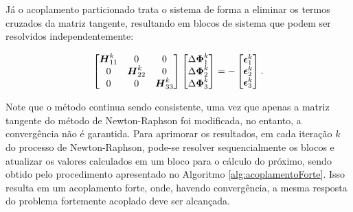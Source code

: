 Já o acoplamento particionado trata o sistema de forma a eliminar os termos cruzados da matriz tangente, resultando em blocos de sistema que podem ser resolvidos independentemente:

\begin{equation}
    \begin{bmatrix}
        \boldsymbol{H}_{11}^k & 0             & 0             \\
        0             & \boldsymbol{H}_{22}^k & 0             \\
        0             & 0             & \boldsymbol{H}_{33}^k
    \end{bmatrix}\begin{bmatrix}
        \Delta\boldsymbol{\Phi}_1^k \\\Delta\boldsymbol{\Phi}_2^k\\\Delta\boldsymbol{\Phi}_3^k
    \end{bmatrix}=-\begin{bmatrix}
        \boldsymbol{\epsilon}_1^k \\\boldsymbol{\epsilon}_2^k\\\boldsymbol{\epsilon}_3^k
    \end{bmatrix}\text{.}
\end{equation}

Note que o método continua sendo consistente, uma vez que apenas a matriz tangente do método de Newton-Raphson foi modificada, no entanto, a convergência não é garantida.
Para aprimorar os resultados, em cada iteração $k$ do processo de Newton-Raphson, pode-se resolver sequencialmente os blocos e atualizar os valores calculados em um bloco para o cálculo do próximo, sendo obtido pelo procedimento apresentado no Algoritmo \ref{alg:acoplamentoForte}. Isso resulta em um acoplamento forte, onde, havendo convergência, a mesma resposta do problema fortemente acoplado deve ser alcançada.

